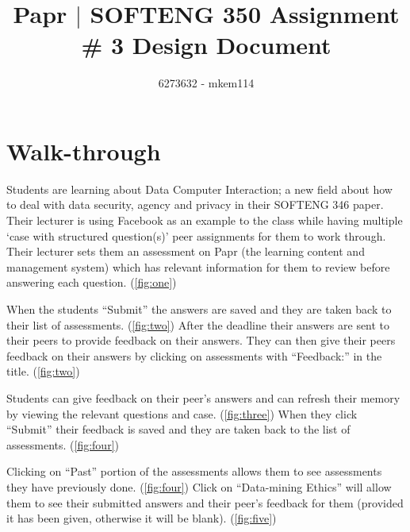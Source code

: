 \documentclass[10pt,a4paper]{article}
\author{6273632 - mkem114}
\title{Papr $|$ SOFTENG 350 Assignment \# 3 Design Document}
\begin{document}
	\pagestyle{fancy}
	\fancyhf{}
	\renewcommand{\headrulewidth}{5pt}
	\renewcommand{\headrule}{\hbox to\headwidth{%
	  \color{orangeBack}\leaders\hrule height \headrulewidth\hfill}}
	\renewcommand{\footrulewidth}{5pt}
	\renewcommand{\footrule}{\hbox to\headwidth{%
	  \color{orangeBack}\leaders\hrule height \footrulewidth\hfill}}
	\renewcommand{\cftsecleader}{\cftdotfill{\cftdotsep}}
	\lfoot{\theauthor}
	\renewcommand{\contentsname}{Table of Contents}

\maketitle
\tableofcontents
\newpage

\section{Walk-through}
	Students are learning about Data Computer Interaction; a new field about how to deal with data security, agency and privacy in their SOFTENG 346 paper. Their lecturer is using Facebook as an example to the class while having multiple `case with structured question(s)' peer assignments for them to work through.\\
	
	Their lecturer sets them an assessment on Papr (the learning content and management system) which has relevant information for them to review before answering each question. (\cref{fig:one})
	
	When the students ``Submit'' the answers are saved and they are taken back to their list of assessments. (\cref{fig:two}) After the deadline their answers are sent to their peers to provide feedback on their answers. They can then give their peers feedback on their answers by clicking on assessments with ``Feedback:'' in the title. (\cref{fig:two})
	
	Students can give feedback on their peer's answers and can refresh their memory by viewing the relevant questions and case. (\cref{fig:three}) When they click ``Submit'' their feedback is saved and they are taken back to the list of assessments. (\cref{fig:four})
	
	Clicking on ``Past'' portion of the assessments allows them to see assessments they have previously done. (\cref{fig:four}) Click on ``Data-mining Ethics'' will allow them to see their submitted answers and their peer's feedback for them (provided it has been given, otherwise it will be blank). (\cref{fig:five})
	
\end{document}

